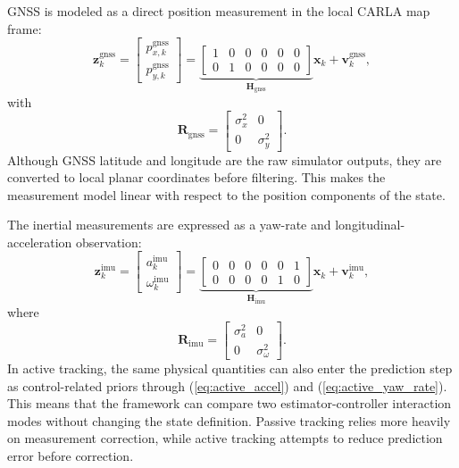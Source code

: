\documentclass[conference]{IEEEtran}
\begin{document}
GNSS is modeled as a direct position measurement in the local CARLA map frame:
\begin{equation}
\mathbf{z}_k^{\mathrm{gnss}}=
\begin{bmatrix}p_{x,k}^{\mathrm{gnss}}\\p_{y,k}^{\mathrm{gnss}}\end{bmatrix}
=
\underbrace{\begin{bmatrix}1&0&0&0&0&0\\0&1&0&0&0&0\end{bmatrix}}_{\mathbf{H}_{\mathrm{gnss}}}
\mathbf{x}_k+
\mathbf{v}_k^{\mathrm{gnss}},
\label{eq:gnss_model}
\end{equation}
with
\begin{equation}
\mathbf{R}_{\mathrm{gnss}}=
\begin{bmatrix}
\sigma_x^2 & 0\\
0 & \sigma_y^2
\end{bmatrix}.
\label{eq:gnss_noise}
\end{equation}
Although GNSS latitude and longitude are the raw simulator outputs, they are converted to local planar coordinates before filtering. This makes the measurement model linear with respect to the position components of the state.

The inertial measurements are expressed as a yaw-rate and longitudinal-acceleration observation:
\begin{equation}
\mathbf{z}_k^{\mathrm{imu}}=
\begin{bmatrix}a_k^{\mathrm{imu}}\\\omega_k^{\mathrm{imu}}\end{bmatrix}
=
\underbrace{\begin{bmatrix}0&0&0&0&0&1\\0&0&0&0&1&0\end{bmatrix}}_{\mathbf{H}_{\mathrm{imu}}}
\mathbf{x}_k+
\mathbf{v}_k^{\mathrm{imu}},
\label{eq:imu_model}
\end{equation}
where
\begin{equation}
\mathbf{R}_{\mathrm{imu}}=
\begin{bmatrix}
\sigma_a^2 & 0\\
0 & \sigma_\omega^2
\end{bmatrix}.
\label{eq:imu_noise}
\end{equation}
In active tracking, the same physical quantities can also enter the prediction step as control-related priors through (\ref{eq:active_accel}) and (\ref{eq:active_yaw_rate}). This means that the framework can compare two estimator-controller interaction modes without changing the state definition. Passive tracking relies more heavily on measurement correction, while active tracking attempts to reduce prediction error before correction.
\end{document}
